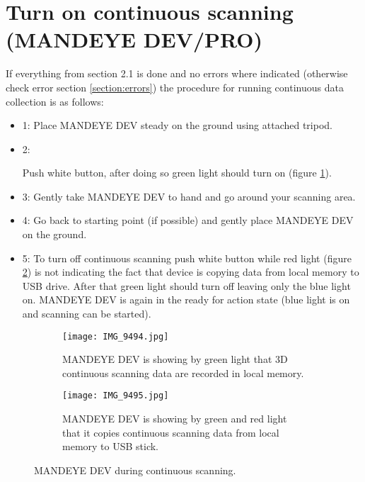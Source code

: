 \section{Turn on continuous scanning (MANDEYE DEV/PRO)}
If everything from section 2.1 is done and no errors where indicated (otherwise check error section \ref{section:errors}) the procedure for running continuous data collection is as follows:
\begin{itemize}
	\item 1: Place MANDEYE DEV steady on the ground using attached tripod.
	\item 2: \begin{minipage}[t]{\linewidth}
		\raggedright
		\medskip	
	\end{minipage}
	Push white button, after doing so green light should turn on (figure \ref{fig:m31}). 
	\item 3: Gently take MANDEYE DEV to hand and go around your scanning area.
	\item 4: Go back to starting point (if possible) and gently place MANDEYE DEV on the ground.
	\item 5: To turn off continuous scanning push white button while red light (figure \ref{fig:m32}) is not indicating the fact that device is copying data from local memory to USB drive. After that green light should turn off leaving only the blue light on. MANDEYE DEV is again in the ready for action state (blue light is on and scanning can be started).
\end{itemize}
\begin{figure}[H]
	\centering
	\begin{subfigure}[b]{0.45\textwidth}
		\centering
		\texttt{[image: IMG\_9494.jpg]}
		\caption{MANDEYE DEV is showing by green light that 3D continuous scanning data are recorded in local memory.}
		\label{fig:m31}
	\end{subfigure}
	\hfill
	\begin{subfigure}[b]{0.45\textwidth}
		\centering
		\texttt{[image: IMG\_9495.jpg]}
		\caption{MANDEYE DEV is showing by green and red light that it copies continuous scanning data from local memory to USB stick.}
		\label{fig:m32}
	\end{subfigure}
	\caption{MANDEYE DEV during continuous scanning.}
	\label{fig:mandeye_hardware3}
\end{figure}


